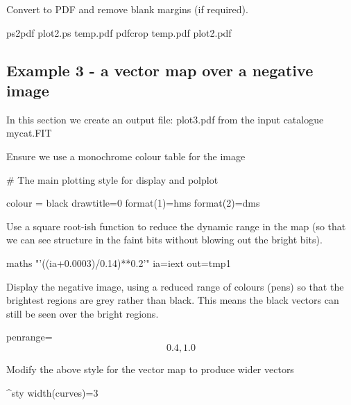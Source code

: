 Convert to PDF and remove blank margins (if required).

\begin{terminalv}
ps2pdf plot2.ps temp.pdf
pdfcrop temp.pdf plot2.pdf
\end{terminalv}

\subsection{ Example 3 - a vector map over a negative image}
\label{section:kappa-example3}


In this section we create an output file: plot3.pdf from the input catalogue mycat.FIT

\begin{terminalv}
\end{terminalv}


Ensure we use a monochrome colour table for the image

\begin{terminalv}
\end{terminalv}


#  The main plotting style for display and polplot

\begin{terminalv}
colour = black
drawtitle=0
format(1)=hms
format(2)=dms
\end{terminalv}


Use a square root-ish function to reduce the dynamic range in the map (so
that we can see structure in the faint bits without blowing out the
bright bits).

\begin{terminalv}
maths "'((ia+0.0003)/0.14)**0.2'" ia=iext out=tmp1
\end{terminalv}


Display the negative image, using a reduced range of colours
(pens) so that the brightest regions are grey rather than black.
This means the black vectors can still be seen over the bright
regions.

\begin{terminalv}
        penrange=\[0.4,1.0\]
\end{terminalv}


Modify the above style for the vector map to produce wider vectors

\begin{terminalv}
^sty
width(curves)=3
\end{terminalv}


